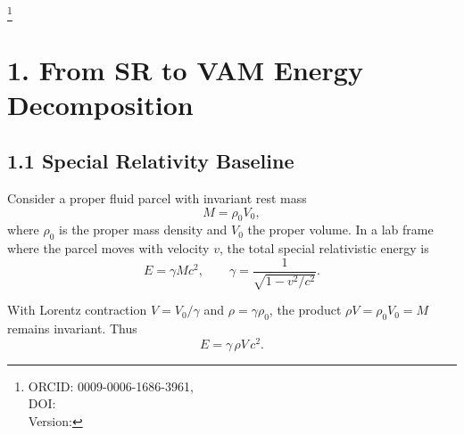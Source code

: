 \documentclass[reprint,aps,onecolumn,nofootinbib]{revtex4-2}
\newcommand{\swirlarrow}{%
    \mathchoice{\mkern-2mu\scriptstyle\boldsymbol{\circlearrowleft}}%
    {\mkern-2mu\scriptstyle\boldsymbol{\circlearrowleft}}%
    {\mkern-2mu\scriptscriptstyle\boldsymbol{\circlearrowleft}}%
    {\mkern-2mu\scriptscriptstyle\boldsymbol{\circlearrowleft}}%
}
\newcommand{\vswirl}{\mathbf{v}_{\swirlarrow}}
\newcommand{\Ce}{\vswirl}
\begin{document}
\title{\papertitle }
\author{Omar Iskandarani}
\thanks{ORCID: 0009-0006-1686-3961,\\
DOI: \paperdoi \\
Version: \paperversion
}
\date{\today}

\begin{abstract}
This paper examines the energetics of transient luminous events (sprites and giant jets) through a systematic mapping from special relativity (SR) to the Vortex \AE ther Model (VAM) and then to the canonical Swirl--String Theory (SST). We show that the SR rest--kinetic decomposition re-emerges in VAM with $c \mapsto \Ce$, and that the same structure has a natural translation into SST via the Swirl Clock formalism. The goal is to provide a coherent physical and mathematical account of excitation (giant jets) and relaxation (sprites) as macroscopic analogues of quantum transitions.]
\end{abstract}
\maketitle
\section*{1. From SR to VAM Energy Decomposition}

    \subsection*{1.1 Special Relativity Baseline}

        Consider a proper fluid parcel with invariant rest mass
        \[
            M = \rho_0 V_0 ,
        \]
        where $\rho_0$ is the proper mass density and $V_0$ the proper volume.
        In a lab frame where the parcel moves with velocity $v$, the total
        special relativistic energy is
        \begin{equation}
        E = \gamma M c^2,
        \qquad
        \gamma = \frac{1}{\sqrt{1 - v^2/c^2}}.
        \label{eq:SRtotal}
        \end{equation}

        With Lorentz contraction $V = V_0/\gamma$ and $\rho = \gamma \rho_0$,
        the product $\rho V = \rho_0 V_0 = M$ remains invariant. Thus
        \begin{equation}
        E = \gamma\, \rho V\, c^2.
        \label{eq:SRrho}
        \end{equation}
\end{document}
